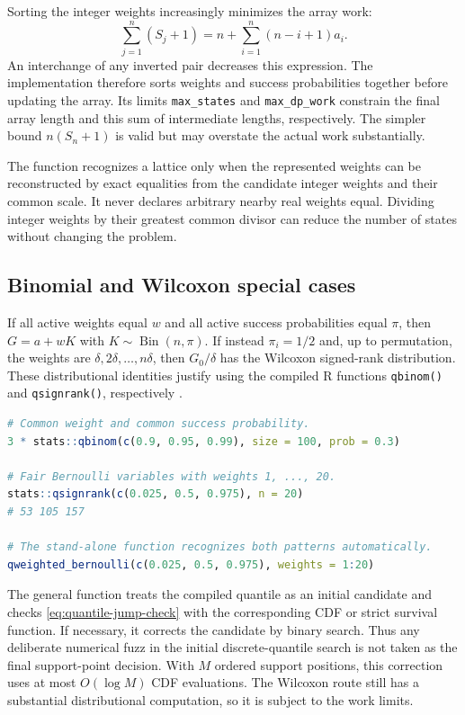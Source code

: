 \documentclass[11pt,letterpaper]{article}
\numberwithin{equation}{section}
\theoremstyle{definition}
\theoremstyle{remark}
\begin{document}
Sorting the integer weights increasingly minimizes the array work:
\[
 \sum_{j=1}^n(S_j+1)
 =n+\sum_{i=1}^n(n-i+1)a_i.
\]
An interchange of any inverted pair decreases this expression.
The implementation therefore sorts weights and success probabilities
together before updating the array.  Its limits \texttt{max\_states}
and \texttt{max\_dp\_work} constrain the final array length and this sum
of intermediate lengths, respectively.  The simpler bound $n(S_n+1)$
is valid but may overstate the actual work substantially.

The function recognizes a lattice only when the represented weights
can be reconstructed by exact equalities from the candidate integer
weights and their common scale.  It never declares arbitrary nearby real
weights equal.  Dividing integer weights by their greatest common divisor
can reduce the number of states without changing the problem.

\subsection{Binomial and Wilcoxon special cases}

If all active weights equal $w$ and all active success probabilities equal
$\pi$, then $G=a+wK$ with $K\sim\operatorname{Bin}(n,\pi)$.  If instead
$\pi_i=1/2$ and, up to permutation, the weights are
$\delta,2\delta,\ldots,n\delta$, then $G_0/\delta$ has the Wilcoxon
signed-rank distribution.  These distributional identities justify using
the compiled R functions \texttt{qbinom()} and \texttt{qsignrank()},
respectively \cite{rbinomial,rsignrank}.
\begin{lstlisting}[language=R]
# Common weight and common success probability.
3 * stats::qbinom(c(0.9, 0.95, 0.99), size = 100, prob = 0.3)

# Fair Bernoulli variables with weights 1, ..., 20.
stats::qsignrank(c(0.025, 0.5, 0.975), n = 20)
# 53 105 157

# The stand-alone function recognizes both patterns automatically.
qweighted_bernoulli(c(0.025, 0.5, 0.975), weights = 1:20)
\end{lstlisting}

The general function treats the compiled quantile as an initial candidate
and checks \eqref{eq:quantile-jump-check} with the corresponding CDF or
strict survival function.  If necessary, it corrects the candidate by
binary search.  Thus any deliberate numerical fuzz in the initial
discrete-quantile search is not taken as the final support-point decision.
With $M$ ordered support positions, this correction uses at most
$O(\log M)$ CDF evaluations.  The Wilcoxon route still has a substantial
distributional computation, so it is subject to the work limits.
\end{document}
